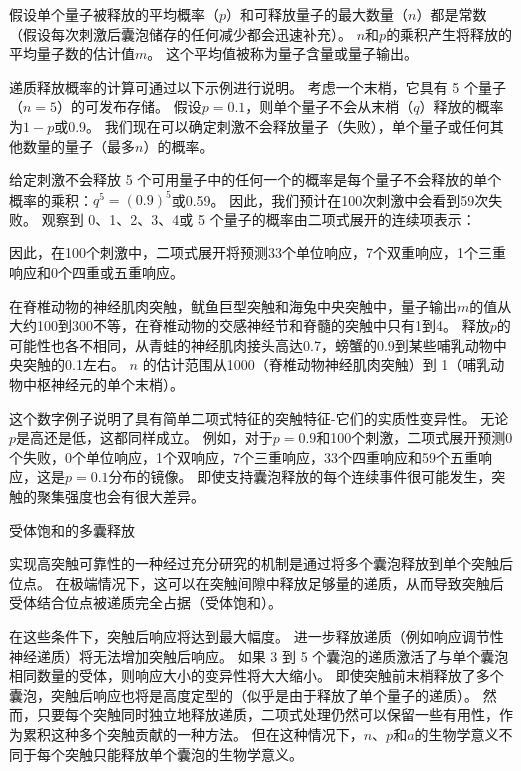 \begin{proposition}[突触强度取决于递质释放的概率和其他量子参数]
	\quad \quad 假设单个量子被释放的平均概率（$ p $）和可释放量子的最大数量（$ n $）都是常数（假设每次刺激后囊泡储存的任何减少都会迅速补充）。
	$ n $和$ p $的乘积产生将释放的平均量子数的估计值$ m $。
	这个平均值被称为量子含量或量子输出。
	
	\quad \quad 递质释放概率的计算可通过以下示例进行说明。
	考虑一个末梢，它具有 5 个量子（$ n=5 $）的可发布存储。
	假设$ p=0.1 $，则单个量子不会从末梢（$ q $）释放的概率为$ 1-p $或0.9。
	我们现在可以确定刺激不会释放量子（失败），单个量子或任何其他数量的量子（最多$ n $）的概率。
	
	\quad \quad 给定刺激不会释放 5 个可用量子中的任何一个的概率是每个量子不会释放的单个概率的乘积：$ q^5 = (0.9)^5 $或0.59。
	因此，我们预计在100次刺激中会看到59次失败。
	观察到 0、1、2、3、4或 5 个量子的概率由二项式展开的连续项表示：
	
	\quad \quad 因此，在100个刺激中，二项式展开将预测33个单位响应，7个双重响应，1个三重响应和0个四重或五重响应。
	
	\quad \quad 在脊椎动物的神经肌肉突触，鱿鱼巨型突触和海兔中央突触中，量子输出$m$的值从大约100到300不等，在脊椎动物的交感神经节和脊髓的突触中只有1到4。
	释放$ p $的可能性也各不相同，从青蛙的神经肌肉接头高达0.7，螃蟹的0.9到某些哺乳动物中央突触的0.1左右。
	$n$ 的估计范围从1000（脊椎动物神经肌肉突触）到 1（哺乳动物中枢神经元的单个末梢）。
	
	\quad \quad 这个数字例子说明了具有简单二项式特征的突触特征-它们的实质性变异性。
	无论$p$是高还是低，这都同样成立。
	例如，对于$ p=0.9 $和100个刺激，二项式展开预测0个失败，0个单位响应，1个双响应，7个三重响应，33个四重响应和59个五重响应，这是$ p=0.1 $分布的镜像。
	即使支持囊泡释放的每个连续事件很可能发生，突触的聚集强度也会有很大差异。
	
	\quad \quad \textcolor[HTML]{00A652}{受体饱和的多囊释放}
	
	\quad \quad 实现高突触可靠性的一种经过充分研究的机制是通过将多个囊泡释放到单个突触后位点。
	在极端情况下，这可以在突触间隙中释放足够量的递质，从而导致突触后受体结合位点被递质完全占据（受体饱和）。
	
	\quad \quad 在这些条件下，突触后响应将达到最大幅度。
	进一步释放递质（例如响应调节性神经递质）将无法增加突触后响应。
	如果 3 到 5 个囊泡的递质激活了与单个囊泡相同数量的受体，则响应大小的变异性将大大缩小。
	即使突触前末梢释放了多个囊泡，突触后响应也将是高度定型的（似乎是由于释放了单个量子的递质）。
	然而，只要每个突触同时独立地释放递质，二项式处理仍然可以保留一些有用性，作为累积这种多个突触贡献的一种方法。
	但在这种情况下，$ n $、$ p $和$ a $的生物学意义不同于每个突触只能释放单个囊泡的生物学意义。
	
\end{proposition}



